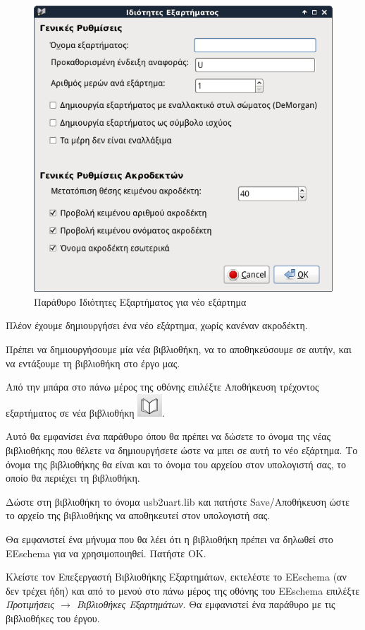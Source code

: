 \documentclass[a4paper]{article}
\begin{document}
\begin{figure}
  \begin{center}
    \includegraphics[width=.5\textwidth]{img/libed-dial-newcompprop.png}
    \caption{Παράθυρο Ιδιότητες Εξαρτήματος για νέο εξάρτημα}
    \label{fig:libed-dial-newcompprop}
  \end{center}
\end{figure}

Πλέον έχουμε δημιουργήσει ένα νέο εξάρτημα, χωρίς κανέναν ακροδέκτη. 

Πρέπει να δημιουργήσουμε μία νέα βιβλιοθήκη, να το αποθηκεύσουμε σε αυτήν, και να εντάξουμε τη βιβλιοθήκη στο έργο μας.

Από την μπάρα στο πάνω μέρος της οθόνης επιλέξτε Αποθήκευση τρέχοντος εξαρτήματος σε νέα βιβλιοθήκη \includegraphics[scale=.5]{img/libed-ico-savnewlib.png}.

Αυτό θα εμφανίσει ένα παράθυρο όπου θα πρέπει να δώσετε το όνομα της νέας βιβλιοθήκης που θέλετε να δημιουργήσετε ώστε να μπει σε αυτή το νέο εξάρτημα. Το όνομα της βιβλιοθήκης θα είναι και το όνομα του αρχείου στον υπολογιστή σας, το οποίο θα περιέχει τη βιβλιοθήκη. 

Δώστε στη βιβλιοθήκη το όνομα \textenglish{usb2uart.lib} και πατήστε Save/Αποθήκευση ώστε το αρχείο της βιβλιοθήκης να αποθηκευτεί στον υπολογιστή σας. 

Θα εμφανιστεί ένα μήνυμα που θα λέει ότι η βιβλιοθήκη πρέπει να δηλωθεί στο \textenglish{EEschema} για να χρησιμοποιηθεί. Πατήστε ΟΚ.

Κλείστε τον Επεξεργαστή Βιβλιοθήκης Εξαρτημάτων, εκτελέστε το \textenglish{EEschema} (αν δεν τρέχει ήδη) και από το μενού στο πάνω μέρος της οθόνης του \textenglish{EEschema} επιλέξτε \textit{Προτιμήσεις $\rightarrow$ Βιβλιοθήκες Εξαρτημάτων}. Θα εμφανιστεί ένα παράθυρο με τις βιβλιοθήκες του έργου. 
\end{document}
